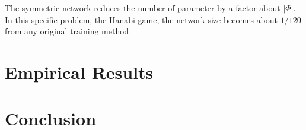 \documentclass[12pt]{article}
\begin{document}
\begin{spacing}{1.15}
The symmetric network reduces the number of parameter by a factor about $|\Phi|$. In this specific problem, the Hanabi game, the network size becomes about $1 / 120$ from any original training method.

\section{Empirical Results}

\section{Conclusion}

\normalem


\end{spacing}
\end{document}
